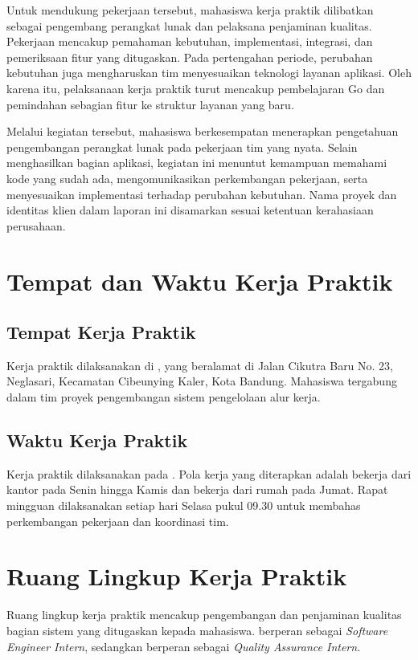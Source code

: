Untuk mendukung pekerjaan tersebut, mahasiswa kerja praktik dilibatkan sebagai pengembang perangkat lunak dan pelaksana penjaminan kualitas. Pekerjaan mencakup pemahaman kebutuhan, implementasi, integrasi, dan pemeriksaan fitur yang ditugaskan. Pada pertengahan periode, perubahan kebutuhan juga mengharuskan tim menyesuaikan teknologi layanan aplikasi. Oleh karena itu, pelaksanaan kerja praktik turut mencakup pembelajaran Go dan pemindahan sebagian fitur ke struktur layanan yang baru.

Melalui kegiatan tersebut, mahasiswa berkesempatan menerapkan pengetahuan pengembangan perangkat lunak pada pekerjaan tim yang nyata. Selain menghasilkan bagian aplikasi, kegiatan ini menuntut kemampuan memahami kode yang sudah ada, mengomunikasikan perkembangan pekerjaan, serta menyesuaikan implementasi terhadap perubahan kebutuhan. Nama proyek dan identitas klien dalam laporan ini disamarkan sesuai ketentuan kerahasiaan perusahaan.

\section{Tempat dan Waktu Kerja Praktik}
\subsection{Tempat Kerja Praktik}
Kerja praktik dilaksanakan di \TempatKP{}, yang beralamat di Jalan Cikutra Baru No. 23, Neglasari, Kecamatan Cibeunying Kaler, Kota Bandung. Mahasiswa tergabung dalam tim proyek pengembangan sistem pengelolaan alur kerja.

\subsection{Waktu Kerja Praktik}
Kerja praktik dilaksanakan pada \PeriodeKP. Pola kerja yang diterapkan adalah bekerja dari kantor pada Senin hingga Kamis dan bekerja dari rumah pada Jumat. Rapat mingguan dilaksanakan setiap hari Selasa pukul 09.30 untuk membahas perkembangan pekerjaan dan koordinasi tim.

\section{Ruang Lingkup Kerja Praktik}
Ruang lingkup kerja praktik mencakup pengembangan dan penjaminan kualitas bagian sistem yang ditugaskan kepada mahasiswa. \NamaRaif{} berperan sebagai \textit{Software Engineer Intern}, sedangkan \NamaFrederiko{} berperan sebagai \textit{Quality Assurance Intern}.

